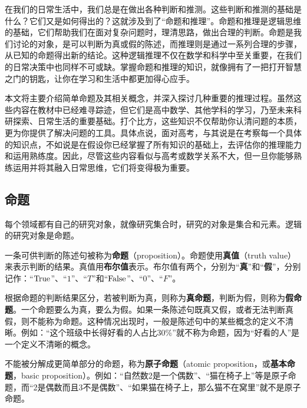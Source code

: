 

\begin{issues}
\issueDraft
\end{issues}


在我们的日常生活中，我们总是在做出各种判断和推测。这些判断和推测的基础是什么？它们又是如何得出的？这就涉及到了“命题和推理”。命题和推理是逻辑思维的基础，它们帮助我们在面对复杂问题时，理清思路，做出合理的判断。命题是我们讨论的对象，是可以判断为真或假的陈述，而推理则是通过一系列合理的步骤，从已知的命题得出新的结论。这种逻辑推理不仅在数学和科学中至关重要，在我们的日常决策中也同样不可或缺。掌握命题和推理的知识，就像拥有了一把打开智慧之门的钥匙，让你在学习和生活中都更加得心应手。

本文将主要介绍简单命题及其相关概念，并深入探讨几种重要的推理过程。虽然这些内容在教材中已经难寻踪迹，但它们是高中数学、其他学科的学习，乃至未来科研探索、日常生活的重要基础。打个比方，这些知识不仅帮助你认清问题的本质，更为你提供了解决问题的工具。具体点说，面对高考，与其说是在考察每一个具体的知识点，不如说是在假设你已经掌握了所有知识的基础上，去评估你的推理能力和运用熟练度。因此，尽管这些内容看似与高考或数学关系不大，但一旦你能够熟练运用并将其融入日常思维，它们将变得极为重要。


\subsection{命题}

每个领域都有自己的研究对象，就像研究集合时，研究的对象是集合和元素。逻辑的研究对象是命题。

一条可供判断的陈述句被称为\textbf{命题}（proposition）。命题使用\textbf{真值}（truth value）来表示判断的结果。真值用\textbf{布尔值}表示。布尔值有两个，分别为“\textbf{真}”和“\textbf{假}”，分别记作：“${\rm True}$”、“$1$”、“$T$”和“${\rm False}$”、“$0$”、“$F$”。

根据命题的判断结果区分，若被判断为真，则称为\textbf{真命题}，判断为假，则称为\textbf{假命题}。一个命题要么为真，要么为假。如果一条陈述句既真又假，或者无法判断真假，则不能称为命题。这种情况出现时，一般是陈述句中的某些概念的定义不清晰。例如：“这个班级中长得好看的人占比$30\%$”就不称为命题，因为“好看的人”是一个定义不清晰的概念。

不能被分解成更简单部分的命题，称为\textbf{原子命题}（atomic proposition，或\textbf{基本命题}，basic proposition）。例如：“自然数2是一个偶数”、“猫在椅子上”等是原子命题，而“2是偶数而且3不是偶数”、“如果猫在椅子上，那么猫不在窝里”就不是原子命题。

